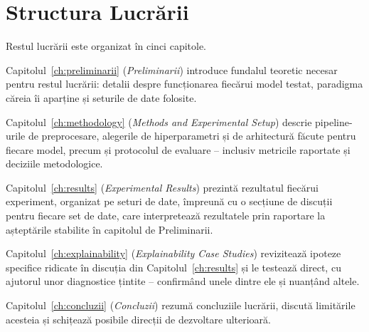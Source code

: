 \section{Structura Lucrării}

Restul lucrării este organizat în cinci capitole.

Capitolul~\ref{ch:preliminarii} (\emph{Preliminarii}) introduce fundalul teoretic necesar pentru restul lucrării: detalii despre funcționarea fiecărui model testat, paradigma căreia îi aparține și seturile de date folosite.

Capitolul~\ref{ch:methodology} (\emph{Methods and Experimental Setup}) descrie pipeline-urile de preprocesare, alegerile de hiperparametri și de arhitectură făcute pentru fiecare model, precum și protocolul de evaluare -- inclusiv metricile raportate și deciziile metodologice.

Capitolul~\ref{ch:results} (\emph{Experimental Results}) prezintă rezultatul fiecărui experiment, organizat pe seturi de date, împreună cu o secțiune de discuții pentru fiecare set de date, care interpretează rezultatele prin raportare la așteptările stabilite în capitolul de Preliminarii.

Capitolul~\ref{ch:explainability} (\emph{Explainability Case Studies}) revizitează ipoteze specifice ridicate în discuția din Capitolul~\ref{ch:results} și le testează direct, cu ajutorul unor diagnostice țintite -- confirmând unele dintre ele și nuanțând altele.

Capitolul~\ref{ch:concluzii} (\emph{Concluzii}) rezumă concluziile lucrării, discută limitările acesteia și schițează posibile direcții de dezvoltare ulterioară.